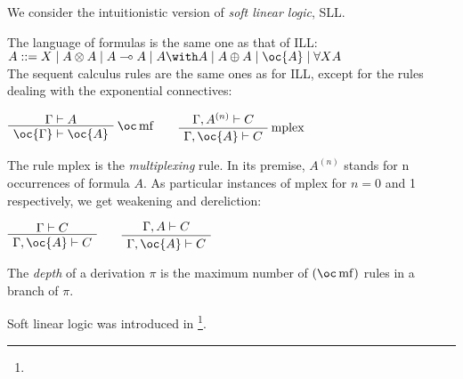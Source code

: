 We consider the intuitionistic version of \emph{soft linear logic}, SLL.

The language of formulas is the same one as that of ILL:
\(A ::= X \mid A\tens A \mid A\limp A \mid A\with A \mid  A\plus A   \mid \oc{A} \mid \forall X A\)\\
The sequent calculus rules are the same ones as for ILL, except for the
rules dealing with the exponential connectives:

\(\AxRule{\Gamma\vdash A}
\LabelRule{\oc\rulename{mf} }
\UnaRule{\oc{\Gamma}\vdash\oc{A}}
\DisplayProof
\qquad
\AxRule{\Gamma,A^{(n)}\vdash C}
\LabelRule{\rulename{mplex}}
\UnaRule{\Gamma,\oc{A}\vdash C}
\DisplayProof\)

The rule mplex is the \emph{multiplexing} rule. In its premise,
\(A^{(n)}\) stands for n occurrences of formula \(A\). As particular
instances of mplex for \(n=0\) and 1 respectively, we get weakening and
dereliction:

\(\AxRule{\Gamma \vdash C}
\UnaRule{\Gamma,\oc{A}\vdash C}
\DisplayProof
\qquad
\AxRule{\Gamma,A\vdash C}
\UnaRule{\Gamma,\oc{A}\vdash C}
\DisplayProof\)

The \emph{depth} of a derivation \(\pi\) is the maximum number of
\((\oc\rulename{mf})\) rules in a branch of \(\pi\).

Soft linear logic was introduced in \footnote{}.


